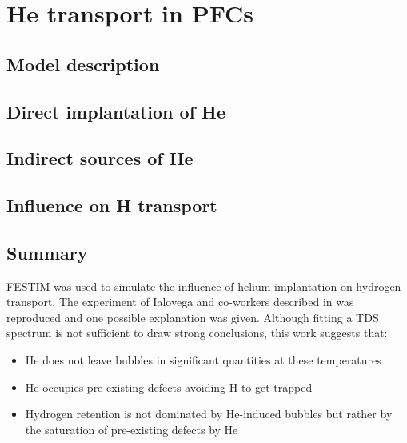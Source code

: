 \setchapterpreamble[u]{\margintoc}
\chapter{He transport in PFCs}
\label{Chapter5} %


\section{Model description}\label{helium model description}

\section{Direct implantation of He}

\section{Indirect sources of He}

\section{Influence on H transport}


\section{Summary}

FESTIM was used to simulate the influence of helium implantation on hydrogen transport.
The experiment of Ialovega and co-workers described in  was reproduced and one possible explanation was given.
Although fitting a TDS spectrum is not sufficient to draw strong conclusions, this work suggests that:
\begin{itemize}
    \item He does not leave bubbles in significant quantities at these temperatures
    \item He occupies pre-existing defects avoiding H to get trapped
    \item Hydrogen retention is not dominated by He-induced bubbles but rather by the saturation of pre-existing defects by He
\end{itemize}

